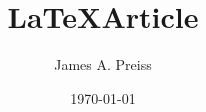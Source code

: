 \documentclass[12pt]{article}
\title{\LaTeX Article}
\author{James A. Preiss}
\date{\monthyear \today}
\begin{document}
\maketitle



{}
\end{document}
